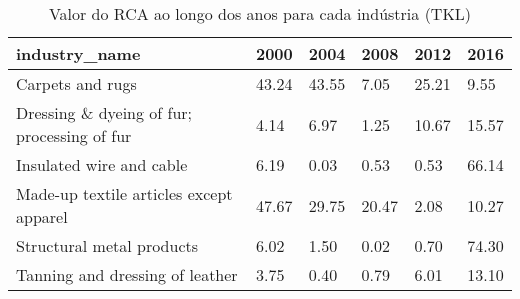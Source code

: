 \begin{table}
\centering
\caption{Valor do RCA ao longo dos anos para cada indústria (TKL)}
\begin{tabular}{p{6cm}p{1.5cm}p{1.5cm}p{1.5cm}p{1.5cm}p{1.5cm}}
\toprule
                              industry\_name &  2000 &  2004 &  2008 &  2012 &  2016 \\
\midrule
                           Carpets and rugs & 43.24 & 43.55 &  7.05 & 25.21 &  9.55 \\
Dressing \& dyeing of fur; processing of fur &  4.14 &  6.97 &  1.25 & 10.67 & 15.57 \\
                   Insulated wire and cable &  6.19 &  0.03 &  0.53 &  0.53 & 66.14 \\
    Made-up textile articles except apparel & 47.67 & 29.75 & 20.47 &  2.08 & 10.27 \\
                  Structural metal products &  6.02 &  1.50 &  0.02 &  0.70 & 74.30 \\
            Tanning and dressing of leather &  3.75 &  0.40 &  0.79 &  6.01 & 13.10 \\
\bottomrule
\end{tabular}
\end{table}
